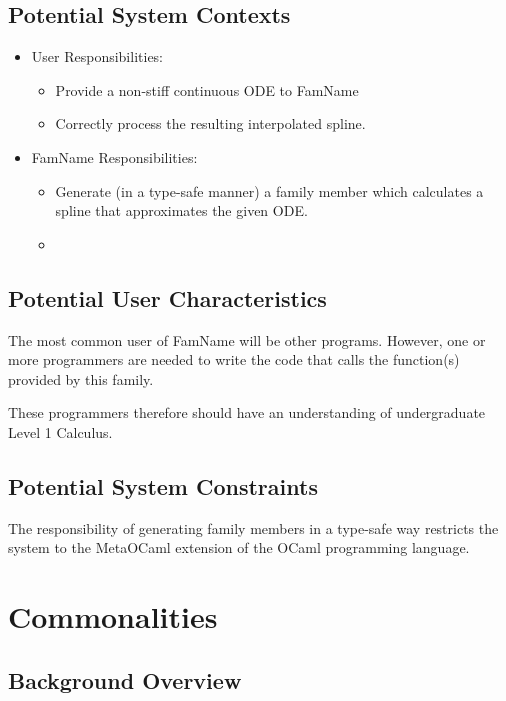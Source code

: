 \documentclass[12pt]{article}
\newcommand{\famname}{FamName} %
\begin{document}
\subsection{Potential System Contexts}


\begin{itemize}
\item User Responsibilities:
\begin{itemize}
\item Provide a non-stiff continuous ODE to \famname{}
\item Correctly process the resulting interpolated spline.
\end{itemize}
\item \famname{} Responsibilities:
\begin{itemize}
\item Generate (in a type-safe manner) a family member which calculates a 
spline that approximates the given ODE.
\item 
\end{itemize}
\end{itemize}

\subsection{Potential User Characteristics} \label{SecUserCharacteristics}

The most common user of \famname{} will be other programs. However, one or more 
programmers are needed to write the code that calls the function(s) provided by 
this family.

These programmers therefore should have an understanding of undergraduate Level
1 Calculus.

\subsection{Potential System Constraints}

The responsibility of generating family members in a type-safe way restricts 
the system to the MetaOCaml extension of the OCaml programming language.

\section{Commonalities}

\subsection{Background Overview} \label{Sec_Background}
\end{document}
